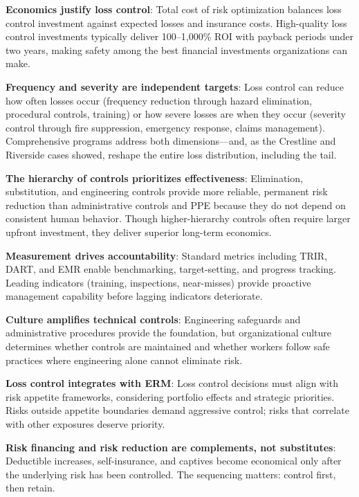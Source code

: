\documentclass[11pt,openany]{book}
\begin{document}
\begin{keytakeaways}
\item
  \textbf{Economics justify loss control}: Total cost of risk optimization
  balances loss control investment against expected losses and insurance
  costs. High-quality loss control investments typically deliver 100--1{,}000\%
  ROI with payback periods under two years, making safety among the best
  financial investments organizations can make.
\item
  \textbf{Frequency and severity are independent targets}: Loss control can
  reduce how often losses occur (frequency reduction through hazard
  elimination, procedural controls, training) or how severe losses are when
  they occur (severity control through fire suppression, emergency response,
  claims management). Comprehensive programs address both dimensions---and, as
  the Crestline and Riverside cases showed, reshape the entire loss
  distribution, including the tail.
\item
  \textbf{The hierarchy of controls prioritizes effectiveness}: Elimination,
  substitution, and engineering controls provide more reliable, permanent risk
  reduction than administrative controls and PPE because they do not depend on
  consistent human behavior. Though higher-hierarchy controls often require
  larger upfront investment, they deliver superior long-term economics.
\item
  \textbf{Measurement drives accountability}: Standard metrics including TRIR,
  DART, and EMR enable benchmarking, target-setting, and progress tracking.
  Leading indicators (training, inspections, near-misses) provide proactive
  management capability before lagging indicators deteriorate.
\item
  \textbf{Culture amplifies technical controls}: Engineering safeguards and
  administrative procedures provide the foundation, but organizational culture
  determines whether controls are maintained and whether workers follow safe
  practices where engineering alone cannot eliminate risk.
\item
  \textbf{Loss control integrates with ERM}: Loss control decisions must align
  with risk appetite frameworks, considering portfolio effects and strategic
  priorities. Risks outside appetite boundaries demand aggressive control;
  risks that correlate with other exposures deserve priority.
\item
  \textbf{Risk financing and risk reduction are complements, not substitutes}:
  Deductible increases, self-insurance, and captives become economical only
  after the underlying risk has been controlled. The sequencing matters:
  control first, then retain.
\end{keytakeaways}
\end{document}
